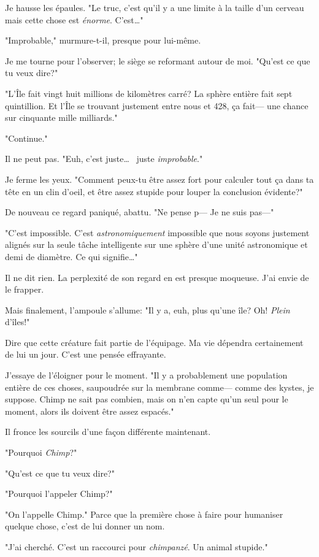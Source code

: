 Je hausse les épaules. "Le truc, c'est qu'il y a une limite à la taille d'un cerveau mais cette chose est \emph{énorme}. C'est\ldots"

"Improbable," murmure-t-il, presque pour lui-même.

Je me tourne pour l'observer; le siège se reformant autour de moi. "Qu'est ce que tu veux dire?"

"L'Île fait vingt huit millions de kilomètres carré? La sphère entière fait sept quintillion. Et l'Île se trouvant justement entre nous et 428, ça fait— une chance sur cinquante mille milliards."

"Continue."

Il ne peut pas. "Euh, c'est juste\ldots~ juste \emph{improbable}."

Je ferme les yeux. "Comment peux-tu être assez fort pour calculer tout ça dans ta tête en un clin d'oeil, et être assez stupide pour louper la conclusion évidente?"

De nouveau ce regard paniqué, abattu. "Ne pense p— Je ne suis pas—"

"C'est impossible. C'est \emph{astronomiquement} impossible que nous soyons justement alignés sur la seule tâche intelligente sur une sphère d'une unité astronomique et demi de diamètre. Ce qui signifie\ldots"

Il ne dit rien. La perplexité de son regard en est presque moqueuse. J'ai envie de le frapper.

Mais finalement, l'ampoule s'allume: "Il y a, euh, plus qu'une île? Oh! \emph{Plein} d'îles!"

Dire que cette créature fait partie de l'équipage. Ma vie dépendra certainement de lui un jour. C'est une pensée effrayante.

J'essaye de l'éloigner pour le moment. "Il y a probablement une population entière de ces choses, saupoudrée sur la membrane comme— comme des kystes, je suppose. Chimp ne sait pas combien, mais on n'en capte qu'un seul pour le moment, alors ils doivent être assez espacés."

Il fronce les sourcils d'une façon différente maintenant. 

"Pourquoi \emph{Chimp}?"

"Qu'est ce que tu veux dire?"

"Pourquoi l'appeler Chimp?"

"On l'appelle Chimp." Parce que la première chose à faire pour humaniser quelque chose, c'est de lui donner un nom.

"J'ai cherché. C’est un raccourci pour \emph{chimpanzé}. Un animal stupide."

